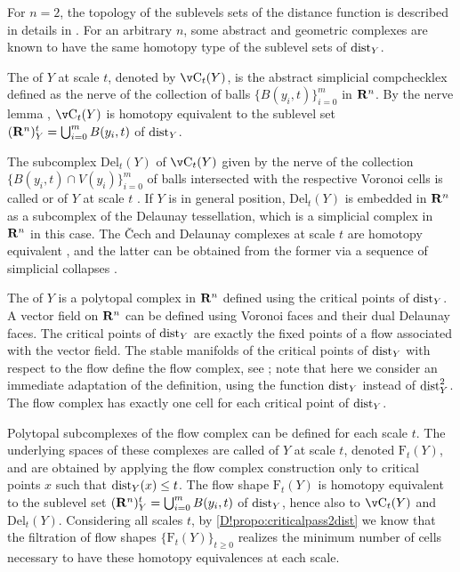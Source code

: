 \begin{example}
  For $n=2$, the topology of the sublevels sets of the distance function is described in details in \cite{siersma1999voronoi}. For an arbitrary $n$, some abstract and geometric complexes are known to have the same homotopy type of the sublevel sets of $\operatorname{dist}_Y$. 

  The  of $Y$ at scale $t$, denoted by  $\Cech_t(Y)$, is the abstract simplicial compchecklex defined as the nerve of the collection of balls $\{B(y_i,t)\}_{i=0}^{m}$ in $\mathbf{R}^n$. By the nerve lemma \cite{borsuk1948imbedding,bauer2023unified}, 
  $\Cech_t(Y)$ is homotopy equivalent to the sublevel set $(\mathbf{R}^n)_Y^t = \bigcup_{i=0}^{m} B(y_i,t)$ of $\operatorname{dist}_Y$. 

  The subcomplex $\mathrm{Del}_t(Y)$ of $\Cech_t(Y)$ given by the nerve of the collection $\{B(y_i,t)\cap V(y_i)\}_{i=0}^{m}$ of balls intersected with the respective Voronoi cells is called  or  of $Y$ at scale $t$ \cite{edelsbrunner1995union}. If $Y$ is in general position, $\mathrm{Del}_t(Y)$ is embedded in $\mathbf{R}^n$ as a subcomplex of the Delaunay tessellation, which is a simplicial complex in $\mathbf{R}^n$ in this case. The \v{C}ech and Delaunay complexes at scale $t$ are homotopy equivalent \cite{edelsbrunner1995union}, and the latter can be obtained from the former via a sequence of simplicial collapses \cite{bauer2017morse}.

  The  of $Y$ \cite{giesen2008flow,buchin2008recursive} is a polytopal complex in $\mathbf{R}^n$ defined using the critical points of $\operatorname{dist}_Y$. A vector field on $\mathbf{R}^n$ can be defined using Voronoi faces and their dual Delaunay faces. The critical points of $\operatorname{dist}_Y$ are exactly the fixed points of a flow associated with the vector field. 
  The stable manifolds of the critical points of $\operatorname{dist}_Y$ with respect to the flow define the flow complex, see \cite[Sect.~3]{buchin2008recursive}; note that here we consider an immediate adaptation of the definition, using the function $\operatorname{dist}_Y$ instead of $\operatorname{dist}^2_Y$. The flow complex has exactly one cell for each critical point of $\operatorname{dist}_Y$. 

  Polytopal subcomplexes of the flow complex can be defined for each scale $t$. The underlying spaces of these complexes are called  of $Y$ at scale $t$, denoted $\mathrm{F}_t(Y)$, and are obtained by applying the flow complex construction only to critical points $x$ such that $\operatorname{dist}_Y(x)\le t$.
  The flow shape $\mathrm{F}_t(Y)$ is homotopy equivalent \cite{buchin2008recursive} to the sublevel set $(\mathbf{R}^n)_Y^t = \bigcup_{i=0}^{m} B(y_i,t)$ of $\operatorname{dist}_Y$, hence also to $\Cech_t(Y)$ and $\mathrm{Del}_t (Y)$. 
  Considering all scales $t$, by \cref{D!propo:criticalpass2dist} we know that the filtration of flow shapes $\{\mathrm{F}_t(Y)\}_{t\ge 0}$ realizes the minimum number of cells necessary to have  these homotopy equivalences at each scale.
\end{example}

